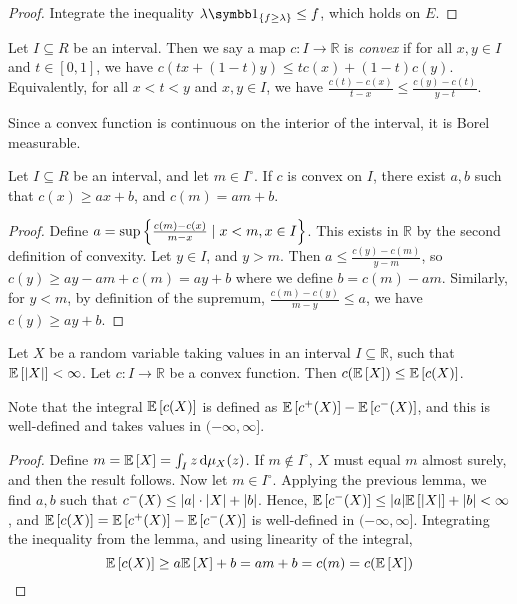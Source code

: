 \begin{proof}
	Integrate the inequality \( \lambda \symbb 1_{\qty{f \geq \lambda}} \leq f \), which holds on \( E \).
\end{proof}
\begin{definition}
	Let \( I \subseteq R \) be an interval.
	Then we say a map \( c \colon I \to \mathbb R \) is \emph{convex} if for all \( x, y \in I \) and \( t \in [0,1] \), we have \( c(tx + (1-t)y) \leq tc(x) + (1-t)c(y) \).
	Equivalently, for all \( x < t < y \) and \( x, y \in I \), we have \( \frac{c(t) - c(x)}{t-x} \leq \frac{c(y) - c(t)}{y-t} \).
\end{definition}
Since a convex function is continuous on the interior of the interval, it is Borel measurable.
\begin{lemma}
	Let \( I \subseteq R \) be an interval, and let \( m \in I^\circ \).
	If \( c \) is convex on \( I \), there exist \( a, b \) such that \( c(x) \geq ax + b \), and \( c(m) = am + b \).
\end{lemma}
\begin{proof}
	Define \( a = \sup \qty{\frac{c(m) - c(x)}{m - x} \mid x < m, x \in I} \).
	This exists in \( \mathbb R \) by the second definition of convexity.
	Let \( y \in I \), and \( y > m \).
	Then \( a \leq \frac{c(y) - c(m)}{y - m} \), so \( c(y) \geq ay - am + c(m) = ay + b \) where we define \( b = c(m) - am \).
	Similarly, for \( y < m \), by definition of the supremum, \( \frac{c(m) - c(y)}{m - y} \leq a \), we have \( c(y) \geq ay + b \).
\end{proof}
\begin{theorem}
	Let \( X \) be a random variable taking values in an interval \( I \subseteq \mathbb R \), such that \( \mathbb{E}\left[{\abs{X}}\right] < \infty \).
	Let \( c \colon I \to \mathbb R \) be a convex function.
	Then \( c(\mathbb{E}\left[{X}\right]) \leq \mathbb{E}\left[{c(X)}\right] \).
\end{theorem}
Note that the integral \( \mathbb{E}\left[{c(X)}\right] \) is defined as \( \mathbb{E}\left[{c^+(X)}\right] - \mathbb{E}\left[{c^-(X)}\right] \), and this is well-defined and takes values in \( (-\infty, \infty] \).
\begin{proof}
	Define \( m = \mathbb{E}\left[{X}\right] = \int_I z \dd{\mu_X(z)} \).
	If \( m \not\in I^\circ \), \( X \) must equal \( m \) almost surely, and then the result follows.
	Now let \( m \in I^\circ \).
	Applying the previous lemma, we find \( a, b \) such that \( c^-(X) \leq \abs{a} \cdot \abs{X} + \abs{b} \).
	Hence, \( \mathbb{E}\left[{c^-(X)}\right] \leq \abs{a} \mathbb{E}\left[{\abs{X}}\right] + \abs{b} < \infty \), and \( \mathbb{E}\left[{c(X)}\right] = \mathbb{E}\left[{c^+(X)}\right] - \mathbb{E}\left[{c^-(X)}\right] \) is well-defined in \( (-\infty,\infty] \).
	Integrating the inequality from the lemma, and using linearity of the integral,
	\[ \mathbb{E}\left[{c(X)}\right] \geq a \mathbb{E}\left[{X}\right] + b = am + b = c(m) = c(\mathbb{E}\left[{X}\right]) \]
\end{proof}

